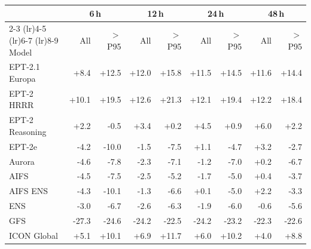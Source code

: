 \begin{tabular}{@{}l*{8}{r}@{}}
\toprule
& \multicolumn{2}{c}{6\,h} & \multicolumn{2}{c}{12\,h} & \multicolumn{2}{c}{24\,h} & \multicolumn{2}{c}{48\,h} \\
\cmidrule(lr){2-3} \cmidrule(lr){4-5} \cmidrule(lr){6-7} \cmidrule(lr){8-9}
Model & All & $>$P95 & All & $>$P95 & All & $>$P95 & All & $>$P95 \\
\midrule
EPT-2.1 Europa & +8.4 & +12.5 & +12.0 & +15.8 & +11.5 & +14.5 & +11.6 & +14.4 \\\addlinespace[0.3em]
EPT-2 HRRR & +10.1 & +19.5 & +12.6 & +21.3 & +12.1 & +19.4 & +12.2 & +18.4 \\\addlinespace[0.3em]
EPT-2 Reasoning & +2.2 & -0.5 & +3.4 & +0.2 & +4.5 & +0.9 & +6.0 & +2.2 \\\addlinespace[0.3em]
EPT-2e & -4.2 & -10.0 & -1.5 & -7.5 & +1.1 & -4.7 & +3.2 & -2.7 \\\addlinespace[0.3em]
Aurora & -4.6 & -7.8 & -2.3 & -7.1 & -1.2 & -7.0 & +0.2 & -6.7 \\\addlinespace[0.3em]
AIFS & -4.5 & -7.5 & -2.5 & -5.2 & -1.7 & -5.0 & +0.4 & -3.7 \\\addlinespace[0.3em]
AIFS ENS & -4.3 & -10.1 & -1.3 & -6.6 & +0.1 & -5.0 & +2.2 & -3.3 \\\addlinespace[0.3em]
ENS & -3.0 & -6.7 & -2.6 & -6.3 & -1.9 & -6.0 & -0.6 & -5.6 \\\addlinespace[0.3em]
GFS & -27.3 & -24.6 & -24.2 & -22.5 & -24.2 & -23.2 & -22.3 & -22.6 \\\addlinespace[0.3em]
ICON Global & +5.1 & +10.1 & +6.9 & +11.7 & +6.0 & +10.2 & +4.0 & +8.8 \\
\bottomrule
\end{tabular}
